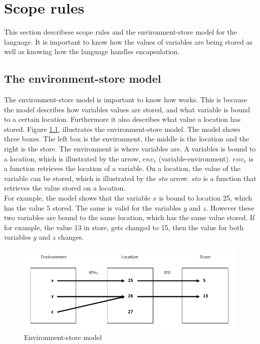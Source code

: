 \chapter{Scope rules}\label{chap:scope-rules}
This section describese scope rules and the environment-store model for the language. It is important to know how the values of variables are being stored as well as knowing how the language handles encapsulation. 

\section{The environment-store model}\label{sec:es-model}
The environment-store model is important to know how works. This is because the model describes how variables values are stored, and what variable is bound to a certain location. Furthermore it also describes what value a location has stored. Figure \ref{fig:esmodel}, illustrates the environment-store model. The model shows three boxes. The left box is the environment, the middle is the location and the right is the store. The environment is where variables are. A variables is bound to a location, which is illustrated by the arrow, $env_v$ (variable-environment). $env_v$ is a function retrieves the location of a variable. On a location, the value of the variable can be stored, which is illustrated by the $sto$ arrow. $sto$ is a function that retrieves the value stored on a location. 
\\For example, the model shows that the variable $x$ is bound to location 25, which has the value $5$ stored. The same is valid for the variables $y$ and $z$. However these two variables are bound to the same location, which has the same value stored. If for example, the value 13 in store, gets changed to 15, then the value for both variables $y$ and $z$ changes. 
\begin{figure}[H]
\includegraphics{billeder/environment_store_model.png}
\caption{Environment-store model}
\label{fig:esmodel}
\end{figure}


